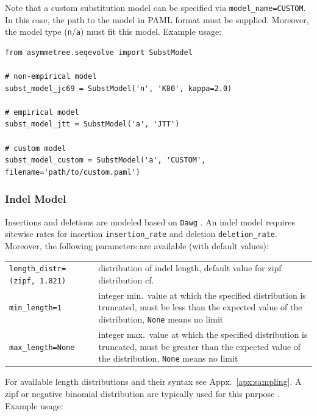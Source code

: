 \documentclass[hidelinks,11pt]{article}
\newcommand{\sq}{\textquotesingle}
\begin{document}
Note that a custom substitution model can be specified via
\texttt{model\_name=\sq CUSTOM\sq}.
In this case, the path to the model in PAML \citep{yang1997} format must be supplied.
Moreover, the model type (\texttt{n}/\texttt{a}) must fit this model.
Example usage:

\begin{adjustwidth}{1cm}{1cm}\vspace{2mm}
\begin{verbatim}
from asymmetree.seqevolve import SubstModel

# non-empirical model
subst_model_jc69 = SubstModel('n', 'K80', kappa=2.0)

# empirical model
subst_model_jtt = SubstModel('a', 'JTT')

# custom model
subst_model_custom = SubstModel('a', 'CUSTOM', filename='path/to/custom.paml')
\end{verbatim}
\end{adjustwidth}


\subsubsection{Indel Model}

Insertions and deletions are modeled based on \texttt{Dawg} \citep{cartwright2005}.
An indel model requires sitewise rates for insertion \texttt{insertion\_rate} and deletion \texttt{deletion\_rate}.
Moreover, the following parameters are available (with default values):

\vspace{3mm}
{\small\centering
\begin{longtable}{ p{4.5cm} p{9cm} }
	\texttt{length\_distr=\newline (\sq zipf\sq, 1.821)} & distribution of indel
	length, default value for zipf distribution cf.\ \citep{chang2004}\\
	\texttt{min\_length=1} & integer min.\ value at which the specified distribution is truncated, must be less than the expected value of the distribution, \texttt{None} means no limit\\
	\texttt{max\_length=None} & integer max.\ value at which the specified distribution is truncated, must be greater than the expected value of the distribution, \texttt{None} means no limit\\
\end{longtable}
}
\vspace{3mm}

\noindent
For available length distributions and their syntax see
Appx.~\ref{apx:sampling}.
A zipf or negative binomial distribution are typically used for this purpose
\cite{cartwright2005,dalquen2012}.
Example usage:
\end{document}
